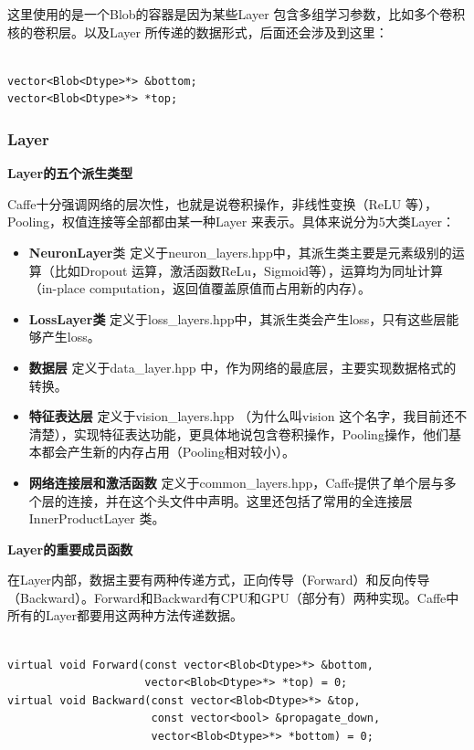 \documentclass[11pt,fleqn, UTF8]{ctexbook} %
\begin{document}
这里使用的是一个Blob的容器是因为某些Layer 包含多组学习参数，比如多个卷积核的卷积层。以及Layer 所传递的数据形式，后面还会涉及到这里：
\lstset{language=C++}
\begin{lstlisting}[frame=single]  % Start your code-block

vector<Blob<Dtype>*> &bottom;
vector<Blob<Dtype>*> *top;

\end{lstlisting}
\subsubsection{Layer}

 \textbf{Layer的五个派生类型}

Caffe十分强调网络的层次性，也就是说卷积操作，非线性变换（ReLU 等），Pooling，权值连接等全部都由某一种Layer 来表示。具体来说分为5大类Layer：
\begin{itemize}
  \item \textbf{NeuronLayer}类 定义于neuron\_layers.hpp中，其派生类主要是元素级别的运算（比如Dropout 运算，激活函数ReLu，Sigmoid等），运算均为同址计算（in-place computation，返回值覆盖原值而占用新的内存）。
  \item \textbf{LossLayer类} 定义于loss\_layers.hpp中，其派生类会产生loss，只有这些层能够产生loss。
  \item \textbf{数据层} 定义于data\_layer.hpp 中，作为网络的最底层，主要实现数据格式的转换。
  \item \textbf{特征表达层} 定义于vision\_layers.hpp （为什么叫vision 这个名字，我目前还不清楚），实现特征表达功能，更具体地说包含卷积操作，Pooling操作，他们基本都会产生新的内存占用（Pooling相对较小）。
  \item \textbf{网络连接层和激活函数} 定义于common\_layers.hpp，Caffe提供了单个层与多个层的连接，并在这个头文件中声明。这里还包括了常用的全连接层InnerProductLayer 类。
\end{itemize}

\textbf{Layer的重要成员函数}

在Layer内部，数据主要有两种传递方式，正向传导（Forward）和反向传导（Backward）。Forward和Backward有CPU和GPU（部分有）两种实现。Caffe中所有的Layer都要用这两种方法传递数据。
\lstset{language=C++}
\begin{lstlisting}[frame=single]  % Start your code-block

virtual void Forward(const vector<Blob<Dtype>*> &bottom,
                     vector<Blob<Dtype>*> *top) = 0;
virtual void Backward(const vector<Blob<Dtype>*> &top,
                      const vector<bool> &propagate_down,
                      vector<Blob<Dtype>*> *bottom) = 0;

\end{lstlisting}
\end{document}
